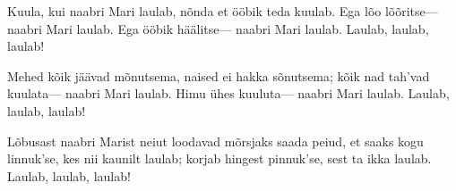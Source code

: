 Kuula, kui naabri Mari laulab,
n\~onda et \"o\"obik teda kuulab.
Ega l\~oo l\~o\~oritse---
naabri Mari laulab.
Ega \"o\"obik h\"a\"alitse---
naabri Mari laulab.
Laulab, laulab, laulab!

Mehed k\~oik j\"a\"avad m\~onutsema,
naised ei hakka s\~onutsema;
k\~oik nad tah'vad kuulata---
naabri Mari laulab.
Himu \"uhes kuuluta---
naabri Mari laulab.
Laulab, laulab, laulab!

L\~obusast naabri Marist neiut
loodavad m\~orsjaks saada peiud,
et saaks kogu linnuk'se,
kes nii kaunilt laulab;
korjab hingest pinnuk'se,
sest ta ikka laulab.
Laulab, laulab, laulab!